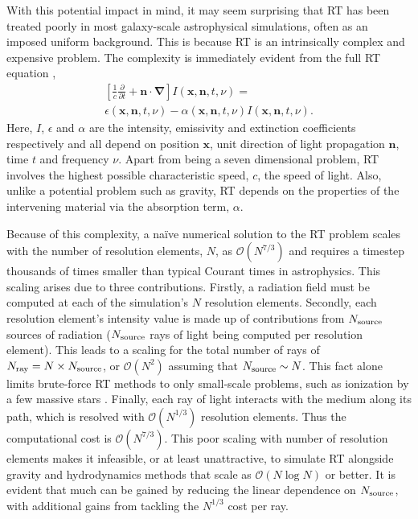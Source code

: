 \documentclass[fleq,usenatbib]{mnras}
\newcommand{\bigO}[1]{\mathcal{O}\left(#1\right)}
\newcommand{\NS}{N_{\rm source}}
\newcommand{\NR}{N_{\rm ray}}
\begin{document}
With this potential impact in mind, it may seem surprising that RT has been treated 
poorly in most galaxy-scale astrophysical simulations, often as an 
imposed uniform background. This is because RT is an intrinsically complex and 
expensive problem. The complexity is immediately evident from the 
full RT equation 
\citep[e.g.][]{mihalasMihalas84},
\begin{eqnarray} \label{eqn:classicrt}
\left[ \frac{1}{c} \frac{\partial}{\partial t} + \mathbf{n \cdot \nabla}
 \right] I\left(\mathbf{x}, \mathbf{n}, t, \nu\right) = \nonumber \\
\epsilon\left(\mathbf{x}, \mathbf{n}, t, \nu\right) - 
\alpha\left(\mathbf{x}, \mathbf{n}, t, \nu\right) 
I\left(\mathbf{x}, \mathbf{n}, t, \nu\right).
\end{eqnarray} 
Here, $I$, $\epsilon$ and $\alpha$ are the intensity, emissivity and 
extinction coefficients respectively and all depend on position $\mathbf{x}$, 
unit direction of light propagation $\mathbf{n}$, time $t$ and frequency 
$\nu$. Apart from being a seven dimensional problem, RT involves the highest 
possible characteristic speed, $c$, the speed of light. Also, unlike a 
potential problem such as gravity, RT depends on the properties of the 
intervening material via the absorption term, $\alpha$.

Because of this complexity, a na\"ive numerical solution to the RT problem 
scales with the number of resolution elements, $N$, as $\bigO{N^{7/3}}$ and 
requires a timestep thousands of times smaller than typical Courant times in 
astrophysics. This scaling arises due to three contributions. Firstly, a 
radiation field must be computed at each of the simulation's $N$ resolution 
elements. Secondly, each resolution element's intensity value is made up of 
contributions from $\NS$ sources of radiation ($\NS$ rays of light being 
computed per resolution element). This leads to a scaling for the total number 
of rays of $\NR = N \times \NS$, or $\bigO{N^2}$ assuming that $\NS \sim N$. 
This fact alone limits brute-force RT methods to only small-scale problems, 
such as ionization by a few massive stars \citep[e.g.][]{howard16, 
howard17}. Finally, each ray of light interacts with the medium along its 
path, which is resolved with $\bigO{N^{1/3}}$ resolution elements. Thus the 
computational cost is $\bigO{N^{7/3}}$. This poor scaling with number of 
resolution elements makes it infeasible, or at least unattractive, to simulate 
RT alongside gravity and hydrodynamics methods that scale as $\bigO{N\log N}$ 
or better. It is evident that much can be gained by reducing the linear 
dependence on $\NS$, with additional gains from tackling the $N^{1/3}$ cost 
per ray.
\end{document}

